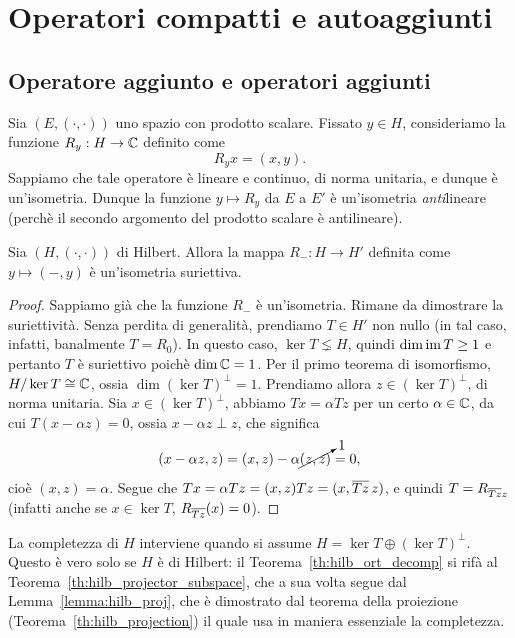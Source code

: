 \chapter{Operatori compatti e autoaggiunti}

\section{Operatore aggiunto e operatori aggiunti}
Sia $(E, (\cdot, \cdot))$ uno spazio con prodotto scalare.
Fissato $y \in H$, consideriamo la funzione $R_y : H \to \mathbb{C}$ definito come
\begin{equation*}
	R_y x = (x,y).
\end{equation*}
Sappiamo che tale operatore è lineare e continuo, di norma unitaria, e dunque è un'isometria. Dunque la funzione $y \mapsto R_y$ da $E$ a $E'$ è un'isometria \emph{anti}lineare (perchè il secondo argomento del prodotto scalare è antilineare).

\begin{theorem}
\label{eq:ops_riesz}
	Sia $(H, (\cdot,\cdot))$ di Hilbert.
	Allora la mappa $R_-: H \to H'$ definita come $y \mapsto (-, y)$ è un'isometria suriettiva.
\end{theorem}
\begin{proof}
	Sappiamo già che la funzione $R_-$ è un'isometria. Rimane da dimostrare la suriettività.
	Senza perdita di generalità, prendiamo $T \in H'$ non nullo (in tal caso, infatti, banalmente $T=R_0$).
	In questo caso, $\ker T \lneq H$, quindi $\dim \operatorname{im} T \geq 1$ e pertanto $T$ è suriettivo poichè $\dim \mathbb{C} = 1$.
	Per il primo teorema di isomorfismo, $H/\ker T \overset{}{\cong} \mathbb{C}$, ossia $\dim(\ker T)^\perp = 1$.
	Prendiamo allora $z \in (\ker T)^\perp$, di norma unitaria.
	Sia $x \in (\ker T)^\perp$, abbiamo $Tx = \alpha Tz$ per un certo $\alpha \in \mathbb{C}$, da cui $T(x-\alpha z) = 0$, ossia $x-\alpha z \perp z$, che significa
	\begin{equation*}
		(x-\alpha z, z) = (x,z) - \alpha \cancelto{1}{(z,z)} = 0,
	\end{equation*}
	cioè $(x,z) = \alpha$. Segue che $Tx = \alpha Tz = (x,z)Tz = (x, \overline{Tz}\, z)$, e quindi $T = R_{\overline{Tz} z}$ (infatti anche se $x \in \ker T$, $R_{\overline{Tz} }(x) = 0$).
\end{proof}

\begin{remark}
	La completezza di $H$ interviene quando si assume ${H = \ker T \oplus (\ker T)^\perp}$. Questo è vero solo se $H$ è di Hilbert: il Teorema~\ref{th:hilb_ort_decomp} si rifà al Teorema~\ref{th:hilb_projector_subspace}, che a sua volta segue dal Lemma~\ref{lemma:hilb_proj}, che è dimostrato dal teorema della proiezione (Teorema~\ref{th:hilb_projection}) il quale usa in maniera essenziale la completezza.
\end{remark}

